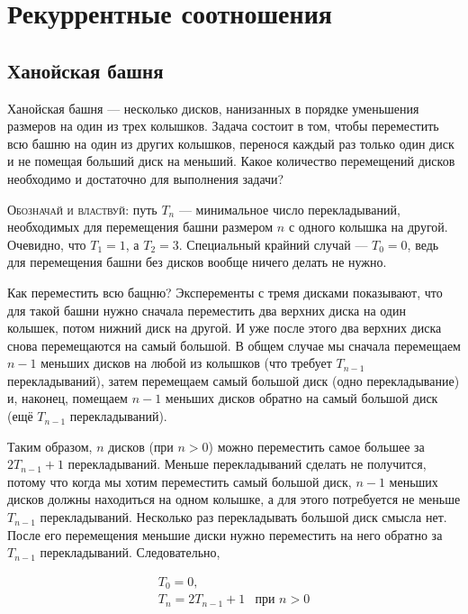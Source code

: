 \documentclass[14pt]{book}
\begin{document}
\begingroup
\hypersetup{linkcolor=black}
\tableofcontents
\endgroup

\clearpage

\chapter{Рекуррентные соотношения}


\section{Ханойская башня}

Ханойская башня --- несколько дисков, нанизанных в порядке уменьшения размеров на один из
трех колышков. Задача состоит в том, чтобы переместить всю башню на один из других колышков,
перенося каждый раз только один диск и не помещая больший диск на меньший.
Какое количество перемещений дисков необходимо и достаточно для выполнения задачи?

\textsc{Обозначай и властвуй}: путь $T_n$ --- минимальное число перекладываний, необходимых
для перемещения башни размером $n$ с одного колышка на другой. Очевидно, что $T_1=1$, а $T_2=3$.
Специальный крайний случай --- $T_0=0$, ведь для перемещения башни без дисков вообще ничего делать
не нужно.

Как переместить всю бащню? Эксперементы с тремя дисками показывают, что для такой башни нужно 
сначала переместить два верхних диска на один колышек, потом нижний диск на другой. И уже 
после этого два верхних диска снова перемещаются на самый большой. В общем случае мы сначала
перемещаем $n-1$ меньших дисков на любой из колышков (что требует $T_{n-1}$ перекладываний),
затем перемещаем самый большой диск (одно перекладывание) и, наконец, помещаем $n-1$
меньших дисков обратно на самый большой диск (ещё $T_{n-1}$ перекладываний). 

Таким образом, $n$ дисков (при $n>0$) можно переместить самое большее за $2T_{n-1}+1$
перекладываний. Меньше перекладываний сделать не получится, потому что когда мы хотим
переместить самый большой диск, $n-1$ меньших дисков должны находиться на одном колышке,
а для этого потребуется не меньше $T_{n-1}$ перекладываний.
Несколько раз перекладывать большой диск смысла нет. После его перемещения меньшие диски нужно
переместить на него обратно за $T_{n-1}$ перекладываний. Следовательно,

\begin{equation}
\label{formula-hanoi-rec}
\begin{array}{ll}
T_0 = 0, \\
T_n = 2T_{n-1} + 1 & \text{при } n > 0 \\
\end{array}
\end{equation}
\end{document}
